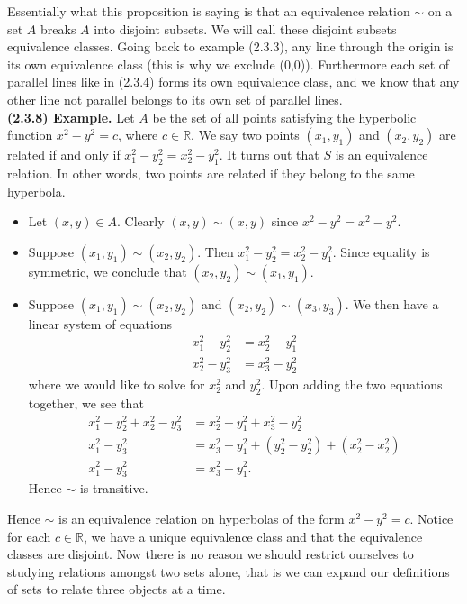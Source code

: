 \documentclass[12pt]{book}
\def\R{{\mathbb{R}}}
\begin{document}

Essentially what this proposition is saying is that an equivalence relation $\sim$ on a set $A$ breaks $A$ into disjoint subsets. We will call these disjoint subsets equivalence classes. Going back to example (2.3.3), any line through the origin is its own equivalence class (this is why we exclude (0,0)). Furthermore each set of parallel lines like in (2.3.4) forms its own equivalence class, and we know that any other line not parallel belongs to its own set of parallel lines.\\


\noindent\textbf{(2.3.8) Example.} Let $A$ be the set of all points satisfying the hyperbolic function $x^2-y^2=c$, where $c\in\R$. We say two points $(x_1,y_1)$ and $(x_2,y_2)$ are related if and only if $x_1^2-y_2^2=x_2^2-y_1^2$. It turns out that $S$ is an equivalence relation. In other words, two points are related if they belong to the same hyperbola. 
\begin{itemize}
\item Let $(x,y)\in A$. Clearly $(x,y)\sim (x,y)$ since $x^2-y^2=x^2-y^2$.
\item Suppose $(x_1,y_1)\sim(x_2,y_2)$. Then $x_1^2-y_2^2=x_2^2-y_1^2$. Since equality is symmetric, we conclude that $(x_2,y_2)\sim(x_1,y_1)$.
\item Suppose $(x_1,y_1)\sim(x_2,y_2)$ and $(x_2,y_2)\sim(x_3,y_3)$. We then have a linear system of equations
\begin{align*}
x_1^2-y_2^2 & = x_2^2-y_1^2\\
x_2^2-y_3^2 & = x_3^2-y_2^2
\end{align*}
where we would like to solve for $x_2^2$ and $y_2^2$. Upon adding the two equations together, we see that 
\begin{align*}
x_1^2-y_2^2+x_2^2-y_3^2 & = x_2^2-y_1^2+x_3^2-y_2^2 \\
x_1^2-y_3^2 & = x_3^2-y_1^2+(y_2^2-y_2^2)+(x_2^2-x_2^2)\\
x_1^2-y_3^2 & = x_3^2-y_1^2.
\end{align*}
Hence $\sim$ is transitive.
\end{itemize}
Hence $\sim$ is an equivalence relation on hyperbolas of the form $x^2-y^2=c$. Notice for each $c\in\R$, we have a unique equivalence class and that the equivalence classes are disjoint. Now there is no reason we should restrict ourselves to studying relations amongst two sets alone, that is we can expand our definitions of sets to relate three objects at a time. \\
\end{document}
